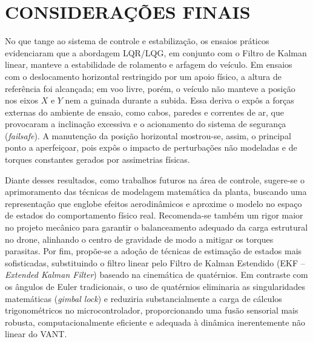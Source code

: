 \chapter{CONSIDERAÇÕES FINAIS}
\label{cap:conclusao}
No que tange ao sistema de controle e estabilização, os ensaios práticos evidenciaram que a abordagem LQR/LQG, em conjunto com o Filtro de Kalman linear, manteve a estabilidade de rolamento e arfagem do veículo. Em ensaios com o deslocamento horizontal restringido por um apoio físico, a altura de referência foi alcançada; em voo livre, porém, o veículo não manteve a posição nos eixos $X$ e $Y$ nem a guinada durante a subida. Essa deriva o expôs a forças externas do ambiente de ensaio, como cabos, paredes e correntes de ar, que provocaram a inclinação excessiva e o acionamento do sistema de segurança (\textit{failsafe}). A manutenção da posição horizontal mostrou-se, assim, o principal ponto a aperfeiçoar, pois expôs o impacto de perturbações não modeladas e de torques constantes gerados por assimetrias físicas.

Diante desses resultados, como trabalhos futuros na área de controle, sugere-se o aprimoramento das técnicas de modelagem matemática da planta, buscando uma representação que englobe efeitos aerodinâmicos e aproxime o modelo no espaço de estados do comportamento físico real. Recomenda-se também um rigor maior no projeto mecânico para garantir o balanceamento adequado da carga estrutural no drone, alinhando o centro de gravidade de modo a mitigar os torques parasitas. Por fim, propõe-se a adoção de técnicas de estimação de estados mais sofisticadas, substituindo o filtro linear pelo Filtro de Kalman Estendido (EKF -- \textit{Extended Kalman Filter}) baseado na cinemática de quatérnios. Em contraste com os ângulos de Euler tradicionais, o uso de quatérnios eliminaria as singularidades matemáticas (\textit{gimbal lock}) e reduziria substancialmente a carga de cálculos trigonométricos no microcontrolador, proporcionando uma fusão sensorial mais robusta, computacionalmente eficiente e adequada à dinâmica inerentemente não linear do VANT.



